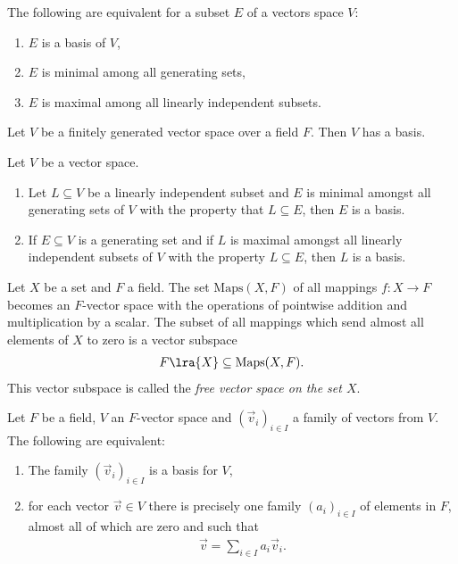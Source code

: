 \documentclass{article}
\begin{document}
\begin{theorem}[Theorem 1.5.12]
	The following are equivalent for a subset $E$ of a vectors space $V$:
	\begin{enumerate}
		\item $E$ is a basis of $V$,
		\item $E$ is minimal among all generating sets,
		\item $E$ is maximal among all linearly independent subsets.
	\end{enumerate}
\end{theorem}

\begin{corollary}[Corollary 1.5.13]
	Let $V$ be a finitely generated vector space over a field $F$. Then $V$
	has a basis.
\end{corollary}

\begin{theorem}[Theorem 1.5.14]
	Let $V$ be a vector space.
	\begin{enumerate}
		\item Let $L\subseteq V$ be a linearly independent subset and $E$ is minimal
		      amongst all generating sets of $V$ with the property that $L\subseteq E$,
		      then $E$ is a basis.
		\item If $E\subseteq V$ is a generating set and if $L$ is maximal amongst all
		      linearly independent subsets of $V$ with the property $L\subseteq E$, then
		      $L$ is a basis.
	\end{enumerate}
\end{theorem}

\begin{definition}
	Let $X$ be a set and $F$ a field. The set $\text{Maps}(X,F)$ of all mappings
	$f:X\to F$ becomes an $F$-vector space with the operations of pointwise
	addition and multiplication by a scalar. The subset of all mappings which send
	almost all elements of $X$ to zero is a vector subspace
	\begin{align*}
		F\lra{X}\subseteq \text{Maps}(X,F).
	\end{align*}
	This vector subspace is called the \emph{free vector space on the set $X$}.
\end{definition}

\begin{theorem}[Theorem 1.5.16]
	Let $F$ be a field, $V$ an $F$-vector space and $(\vec v_i)_{i\in I}$ a
	family of vectors from $V$. The following are equivalent:
	\begin{enumerate}
		\item The family $(\vec v_i)_{i\in I}$ is a basis for $V$,
		\item for each vector $\vec v\in V$ there is precisely one family $(a_i)_{i\in I}$
		      of elements in $F$, almost all of which are zero and such that \begin{align*}
			      \vec v = \sum_{i\in I}a_i\vec v_i.
		      \end{align*}
	\end{enumerate}
\end{theorem}
\end{document}
